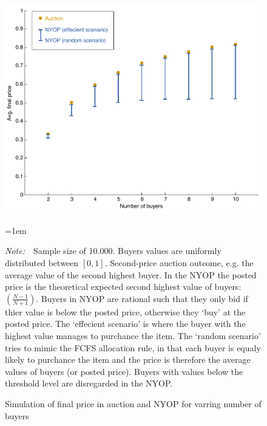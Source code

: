 \documentclass[a4paper,12pt]{article}
\newcommand{\Figtext}[1]{%
	\begin{tablenotes}[para,flushleft]
		\hangindent=1em
		\footnotesize
		\raggedright
		#1
	\end{tablenotes}
}
\newcommand{\Fignote}[1]{\Figtext{\emph{Note:~}~#1}}
\begin{document}
	\begin{figure}
	        \centering
	        \caption{Simulation of final price in auction and NYOP for varring number of buyers}
	        \includegraphics[width=\textwidth]{Figures/FinalPrice_Auction-NYOP}
			\label{fig:FinalPrice_Auction-NYOP}
			\Fignote{Sample size of 10.000. Buyers values are uniformly distributed between $[0,1]$. Second-price auction outcome, e.g. the average value of the second highest buyer. In the NYOP the posted price is the theoretical expected second highest value of buyers: $(\frac{N-1}{N+1})$. Buyers in NYOP are rational such that they only bid if thier value is below the posted price, otherwise they `buy' at the posted price. The `effecient scenario' is where the buyer with the highest value manages to purchance the item. The `random scenario' tries to mimic the FCFS allocation rule, in that each buyer is equaly likely to purchance the item and the price is therefore the average values of buyers (or posted price). Buyers with values below the threshold level are disregarded in the NYOP.}
	\end{figure}
	
\end{document}
